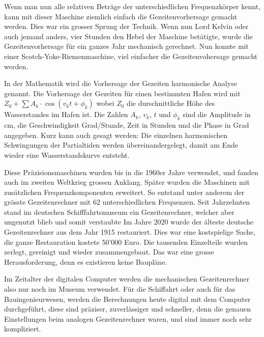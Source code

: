 Wenn man nun alle relativen Beträge der unterschiedlichen Frequenzkörper kennt, kann mit dieser Maschine ziemlich einfach die Gezeitenvorhersage gemacht werden.
Dies war ein grosser Sprung der Technik.
Wenn nun Lord Kelvin oder auch jemand anders, vier Stunden den Hebel der Maschine betätigte, wurde die Gezeitenvorhersage für ein ganzes Jahr mechanisch gerechnet.
Nun konnte mit einer Scotch-Yoke-Riemenmaschine, viel einfacher die Gezeitenvohersage gemacht werden.

In der Mathematik wird die Vorhersage der Gezeiten harmonische Analyse genannt.
Die Vorhersage der Gezeiten für einen bestimmten Hafen wird mit $Z_0+\sum A_k\cdot\cos(v_kt+\phi_k)$ wobei $Z_0$ die durschnittliche Höhe des Wasserstandes im Hafen ist. Die Zahlen $A_k$, $v_k$, $t$ und $\phi_k$ sind die Amplitude in cm, die Geschwindigkeit Grad/Stunde, Zeit in Stunden und die Phase in Grad angegeben.
Kurz kann auch gesagt werden: Die einzelnen harmonischen Schwingungen der Partialtiden werden übereinandergelegt, damit am Ende wieder eine Wasserstandskurve entsteht.

Diese Präzisionsmaschinen wurden bis in die 1960er Jahre verwendet, und fanden auch im zweiten Weltkrieg grossen Anklang.
Später wurden die Maschinen mit zusätzlichen Frequenzkomponenten erweitert.
So entstand unter anderem der grösste Gezeitenrechner mit 62 unterschiedlichen Frequenzen.
Seit Jahrzehnten stand im deutschen Schifffahrtsmuseum ein Gezeitenrechner, welcher aber ungenutzt blieb und somit verstaubte
Im Jahre 2020 wurde der älteste deutsche Gezeitenrechner aus dem Jahr 1915 restauriert.
Dies war eine kostspielige Sache, die ganze Restauration kostete 50'000 Euro.
Die tausenden Einzelteile wurden zerlegt, gereinigt und wieder zusammengebaut.
Das war eine grosse Herausforderung, denn es existieren keine Baupläne.

Im Zeitalter der digitalen Computer werden die mechanischen Gezeitenrechner also nur noch im Museum verwendet.
Für die Schiffahrt oder auch für das Bauingenieurwesen, werden die Berechnungen heute digital mit dem Computer durchgeführt, diese sind präziser, zuverlässiger und schneller, denn die genauen Einstellungen beim analogen Gezeitenrechner waren, und sind immer noch sehr kompliziert.
